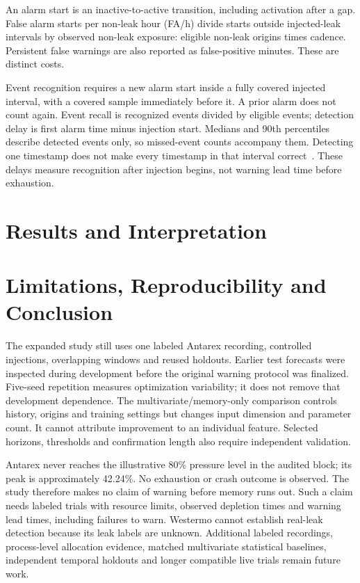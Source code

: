 \documentclass{llncs}
\begin{document}
An alarm start is an inactive-to-active transition, including activation after a gap. False alarm starts per non-leak hour (FA/h) divide starts outside injected-leak intervals by observed non-leak exposure: eligible non-leak origins times cadence. Persistent false warnings are also reported as false-positive minutes. These are distinct costs.

Event recognition requires a new alarm start inside a fully covered injected interval, with a covered sample immediately before it. A prior alarm does not count again. Event recall is recognized events divided by eligible events; detection delay is first alarm time minus injection start. Medians and 90th percentiles describe detected events only, so missed-event counts accompany them. Detecting one timestamp does not make every timestamp in that interval correct~\cite{ref43,ref44}. These delays measure recognition after injection begins, not warning lead time before exhaustion.

\section{Results and Interpretation}


\section{Limitations, Reproducibility and Conclusion}
The expanded study still uses one labeled Antarex recording, controlled injections, overlapping windows and reused holdouts. Earlier test forecasts were inspected during development before the original warning protocol was finalized. Five-seed repetition measures optimization variability; it does not remove that development dependence. The multivariate/memory-only comparison controls history, origins and training settings but changes input dimension and parameter count. It cannot attribute improvement to an individual feature. Selected horizons, thresholds and confirmation length also require independent validation.

Antarex never reaches the illustrative 80\% pressure level in the audited block; its peak is approximately 42.24\%. No exhaustion or crash outcome is observed. The study therefore makes no claim of warning before memory runs out. Such a claim needs labeled trials with resource limits, observed depletion times and warning lead times, including failures to warn. Westermo cannot establish real-leak detection because its leak labels are unknown. Additional labeled recordings, process-level allocation evidence, matched multivariate statistical baselines, independent temporal holdouts and longer compatible live trials remain future work.
\end{document}

